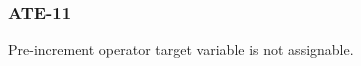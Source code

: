 \subsubsection{ATE-11}\label{sec:error_code_ate_11}

Pre-increment operator target variable is not assignable.


